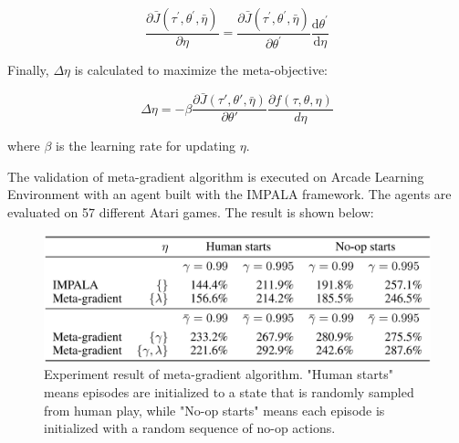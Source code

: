 \[\frac{\partial \bar{J}\left(\tau^{\prime}, \theta^{\prime}, \bar{\eta}\right)}{\partial \eta}=\frac{\partial \bar{J}\left(\tau^{\prime}, \theta^{\prime}, \bar{\eta}\right)}{\partial \theta^{\prime}} \frac{\mathrm{d} \theta^{\prime}}{\mathrm{d} \eta}\]

Finally, $\Delta\eta$ is calculated to maximize the meta-objective:

\[\Delta \eta = -\beta \frac{\partial \bar{J}(\tau', \theta', \bar{\eta})}{\partial \theta'} \frac{\partial f(\tau, \theta, \eta)}{d\eta}\]

where $\beta$ is the learning rate for updating $\eta$.

\par
The validation of meta-gradient algorithm is executed on Arcade Learning Environment with an agent built with the IMPALA framework. The agents are evaluated on 57 different Atari games. The result is shown below:
\begin{figure}[H]
	\includegraphics[scale=0.3]{meta-gradient-result.png}
	\centering
	\caption{Experiment result of meta-gradient algorithm. "Human starts" means episodes are initialized to a state that is randomly sampled from human play, while "No-op starts" means each episode is initialized with a random sequence of no-op actions.}
	\label{meta-gradient-result}
\end{figure}
% 
% 
% 